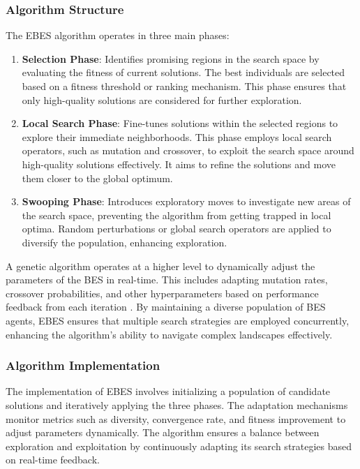 \documentclass[conference]
{IEEEtran}
\begin{document}
\subsubsection{Algorithm Structure}

The EBES algorithm operates in three main phases:

\begin{enumerate}
    \item \textbf{Selection Phase}: Identifies promising regions in the search space by evaluating the fitness of current solutions. The best individuals are selected based on a fitness threshold or ranking mechanism. This phase ensures that only high-quality solutions are considered for further exploration.
    \item \textbf{Local Search Phase}: Fine-tunes solutions within the selected regions to explore their immediate neighborhoods. This phase employs local search operators, such as mutation and crossover, to exploit the search space around high-quality solutions effectively. It aims to refine the solutions and move them closer to the global optimum.
    \item \textbf{Swooping Phase}: Introduces exploratory moves to investigate new areas of the search space, preventing the algorithm from getting trapped in local optima. Random perturbations or global search operators are applied to diversify the population, enhancing exploration.
\end{enumerate}

A genetic algorithm operates at a higher level to dynamically adjust the parameters of the BES in real-time. This includes adapting mutation rates, crossover probabilities, and other hyperparameters based on performance feedback from each iteration \cite{eiben1999parameter}. By maintaining a diverse population of BES agents, EBES ensures that multiple search strategies are employed concurrently, enhancing the algorithm's ability to navigate complex landscapes effectively.

\subsubsection{Algorithm Implementation}

The implementation of EBES involves initializing a population of candidate solutions and iteratively applying the three phases. The adaptation mechanisms monitor metrics such as diversity, convergence rate, and fitness improvement to adjust parameters dynamically. The algorithm ensures a balance between exploration and exploitation by continuously adapting its search strategies based on real-time feedback.
\end{document}
